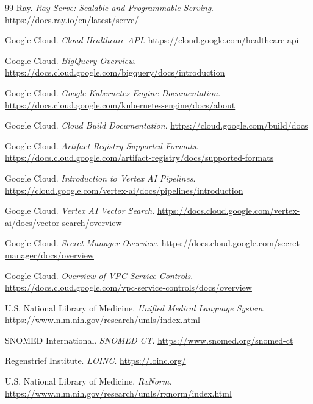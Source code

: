 \begin{thebibliography}{99}
Ray.
\newblock \textit{Ray Serve: Scalable and Programmable Serving}.
\newblock \url{https://docs.ray.io/en/latest/serve/}

Google Cloud.
\newblock \textit{Cloud Healthcare API}.
\newblock \url{https://cloud.google.com/healthcare-api}

Google Cloud.
\newblock \textit{BigQuery Overview}.
\newblock \url{https://docs.cloud.google.com/bigquery/docs/introduction}

Google Cloud.
\newblock \textit{Google Kubernetes Engine Documentation}.
\newblock \url{https://docs.cloud.google.com/kubernetes-engine/docs/about}

Google Cloud.
\newblock \textit{Cloud Build Documentation}.
\newblock \url{https://cloud.google.com/build/docs}

Google Cloud.
\newblock \textit{Artifact Registry Supported Formats}.
\newblock \url{https://docs.cloud.google.com/artifact-registry/docs/supported-formats}

Google Cloud.
\newblock \textit{Introduction to Vertex AI Pipelines}.
\newblock \url{https://cloud.google.com/vertex-ai/docs/pipelines/introduction}

Google Cloud.
\newblock \textit{Vertex AI Vector Search}.
\newblock \url{https://docs.cloud.google.com/vertex-ai/docs/vector-search/overview}

Google Cloud.
\newblock \textit{Secret Manager Overview}.
\newblock \url{https://docs.cloud.google.com/secret-manager/docs/overview}

Google Cloud.
\newblock \textit{Overview of VPC Service Controls}.
\newblock \url{https://docs.cloud.google.com/vpc-service-controls/docs/overview}

U.S. National Library of Medicine.
\newblock \textit{Unified Medical Language System}.
\newblock \url{https://www.nlm.nih.gov/research/umls/index.html}

SNOMED International.
\newblock \textit{SNOMED CT}.
\newblock \url{https://www.snomed.org/snomed-ct}

Regenstrief Institute.
\newblock \textit{LOINC}.
\newblock \url{https://loinc.org/}

U.S. National Library of Medicine.
\newblock \textit{RxNorm}.
\newblock \url{https://www.nlm.nih.gov/research/umls/rxnorm/index.html}


\end{thebibliography}
